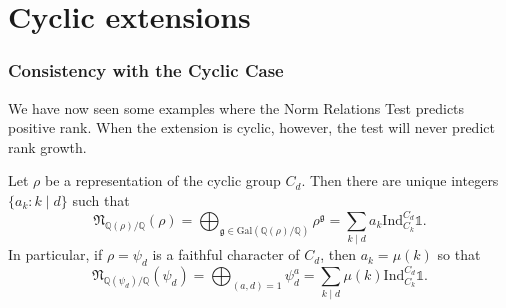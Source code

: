 \documentclass{beamer}
\newcommand{\Gal}{\mathrm{Gal}}
\newcommand{\Ind}{\mathrm{Ind}}
\newcommand{\QQ}{\mathbb{Q}}
\newcommand{\bQ}{\mathbb{Q}}
\newcommand{\fN}{\mathfrak{N}}
\newcommand{\repnorm}[1]{\fN_{\bQ(#1) / \bQ}(#1)}
\theoremstyle{plain}
\begin{document}
\section*{Cyclic extensions}
\frame{\sectionpage}

\begin{frame}
    \frametitle{Consistency with the Cyclic Case}
    We have now seen some examples where the Norm Relations Test predicts positive rank. When the extension is cyclic, however, the test will never predict rank growth. \pause

    \begin{lemma}
        Let $\rho$ be a representation of the cyclic group $C_d$. Then there are unique integers $\{a_k:k\mid d\}$ such that 
        $$\repnorm{\rho}=\bigoplus_{\mathfrak{g}\in\Gal(\QQ(\rho)/\QQ)}\rho^{\mathfrak{g}}=\sum_{k\mid d}a_k\Ind_{C_k}^{C_d}\mathds{1}.$$
        \pause In particular, if $\rho=\psi_d$ is a faithful character of $C_d$, then $a_k=\mu(k)$ so that
        $$\repnorm{\psi_d}=\bigoplus_{(a,d)=1}\psi_d^a=\sum_{k\mid d}\mu(k)\Ind_{C_k}^{C_d}\mathds{1}.$$
    \end{lemma}

\end{frame}
\end{document}
